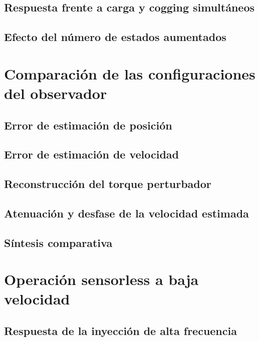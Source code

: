 \subsection{Respuesta frente a carga y cogging simultáneos}

\subsection{Efecto del número de estados aumentados}


\section{Comparación de las configuraciones del observador}

\subsection{Error de estimación de posición}

\subsection{Error de estimación de velocidad}

\subsection{Reconstrucción del torque perturbador}

\subsection{Atenuación y desfase de la velocidad estimada}

\subsection{Síntesis comparativa}


\section{Operación sensorless a baja velocidad}

\subsection{Respuesta de la inyección de alta frecuencia}

